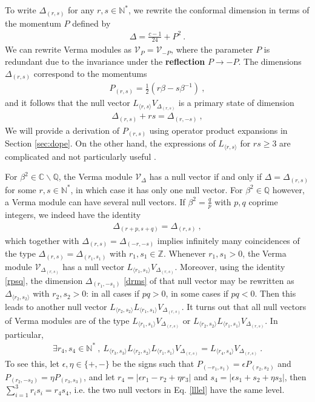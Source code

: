 \documentclass[12pt, a4paper]{article}
\newcommand{\myindex}[1]{\textbf{\boldmath #1}}
\theoremstyle{break}
\begin{document}
To write $\Delta_{(r, s)}$ for any $r,s\in\mathbb{N}^*$, we rewrite the conformal dimension in terms of the momentum $P$ defined by 
\begin{align}
 \boxed{\Delta = \frac{c-1}{24} + P^2}\ .
 \label{dp}
\end{align}
We can rewrite Verma modules as $\mathcal{V}_P=\mathcal{V}_{-P}$, where the parameter $P$ is redundant due to the invariance under the \myindex{reflection} $P\to -P$. The dimensions $\Delta_{(r, s)}$ correspond to the momentums 
\begin{align}
 \boxed{P_{(r, s)} = \frac12\left(r\beta -s\beta^{-1}\right)}\ ,
 \label{prs}
\end{align}
and it follows that the null vector $L_{\langle r,s\rangle} V_{\Delta_{(r, s)}}$ is a primary state of dimension
\begin{align}
 \Delta_{(r, s)} + rs = \Delta_{(r, -s)}\ , 
 \label{drms}
\end{align}
We will provide a derivation of $P_{(r, s)}$ using operator product expansions in Section \ref{sec:dope}. On the other hand, the expressions of $L_{\langle r,s\rangle} $ for $rs\geq 3$ are complicated and not particularly useful \cite{fms97}.

For $\beta^2\in\mathbb{C}\backslash \mathbb{Q}$, the Verma module $\mathcal{V}_\Delta$ has a null vector if and only if $\Delta=\Delta_{(r, s)}$ for some $r,s\in\mathbb{N}^*$, in which case it has only one null vector. For $\beta^2\in\mathbb{Q}$ however, a Verma module can have several null vectors. If $\beta^2 = \frac{q}{p}$ with $p,q$ coprime integers, we indeed have the identity
\begin{align}
 \Delta_{(r+p,s+q)} = \Delta_{(r,s)}\ ,
 \label{rpsq}
\end{align}
which together with $\Delta_{(r,s)}=\Delta_{(-r,-s)}$ implies infinitely many coincidences of the type $\Delta_{(r,s)}=\Delta_{(r_1,s_1)}$ with $r_1,s_1\in\mathbb{Z}$. 
Whenever $r_1,s_1>0$, the Verma module $\mathcal{V}_{\Delta_{(r,s)}}$ has a null vector $L_{\langle r_1,s_1\rangle} V_{\Delta_{(r,s)}}$. 
Moreover, using the identity \eqref{rpsq}, the dimension $\Delta_{(r_1,-s_1)}$ \eqref{drms} of that null vector may be rewritten as $\Delta_{\langle r_2,s_2\rangle}$ with $r_2,s_2>0$: in all cases if $pq>0$, in some cases if $pq<0$. Then this leads to another null vector $L_{\langle r_2,s_2\rangle}L_{\langle r_1,s_1\rangle} V_{\Delta_{(r,s)}}$. It turns out that all null vectors of Verma modules are of the type $L_{\langle r_1,s_1\rangle} V_{\Delta_{(r,s)}}$ or $L_{\langle r_2,s_2\rangle}L_{\langle r_1,s_1\rangle} V_{\Delta_{(r,s)}}$. In particular,
\begin{align}
 \exists r_4,s_4\in \mathbb{N}^*\ , \ L_{\langle r_3,s_3\rangle}L_{\langle r_2,s_2\rangle}L_{\langle r_1,s_1\rangle} V_{\Delta_{(r,s)}} = L_{\langle r_4,s_4\rangle} V_{\Delta_{(r,s)}}\ .
 \label{lllel}
\end{align}
To see this, let $\epsilon,\eta\in\{+,-\}$ be the signs such that $P_{(-r_1,s_1)}=\epsilon P_{(r_2,s_2)}$ and $P_{(r_2,-s_2)}=\eta P_{(r_3,s_3)}$, and let $r_4=|\epsilon r_1-r_2+\eta r_3|$ and $s_4=|\epsilon s_1+s_2+\eta s_3|$, then $\sum_{i=1}^3 r_is_i=r_4s_4$, i.e. the two null vectors in Eq. \eqref{lllel} have the same level. 
\end{document}
